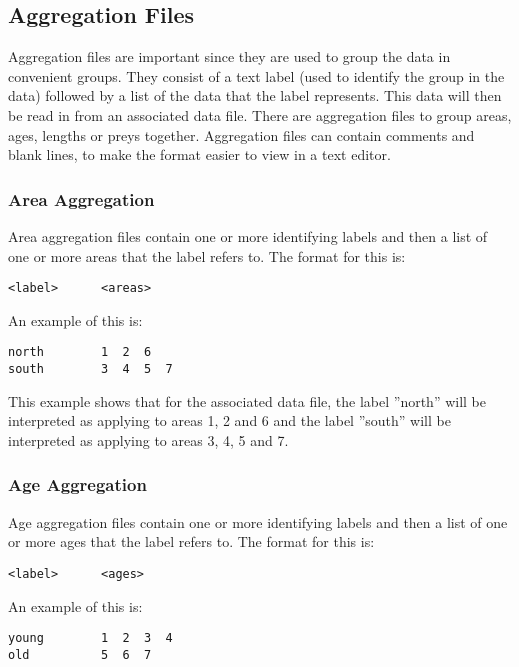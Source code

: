 \documentclass[10pt,twoside]{book}
\begin{document}
\subsection{Aggregation Files}
Aggregation files are important since they are used to group the data in convenient groups.  They consist of a text label (used to identify the group in the data) followed by a list of the data that the label represents.  This data will then be read in from an associated data file.  There are aggregation files to group areas, ages, lengths or preys together.  Aggregation files can contain comments and blank lines, to make the format easier to view in a text editor.

\subsubsection{Area Aggregation}
Area aggregation files contain one or more identifying labels and then a list of one or more areas that the label refers to.  The format for this is:

{\small\begin{verbatim}
<label>      <areas>
\end{verbatim}}

An example of this is:

{\small\begin{verbatim}
north        1  2  6
south        3  4  5  7
\end{verbatim}}

This example shows that for the associated data file, the label ''north'' will be interpreted as applying to areas 1, 2 and 6 and the label ''south'' will be interpreted as applying to areas 3, 4, 5 and 7.

\subsubsection{Age Aggregation}
Age aggregation files contain one or more identifying labels and then a list of one or more ages that the label refers to.  The format for this is:

{\small\begin{verbatim}
<label>      <ages>
\end{verbatim}}

An example of this is:

{\small\begin{verbatim}
young        1  2  3  4
old          5  6  7
\end{verbatim}}
\end{document}
